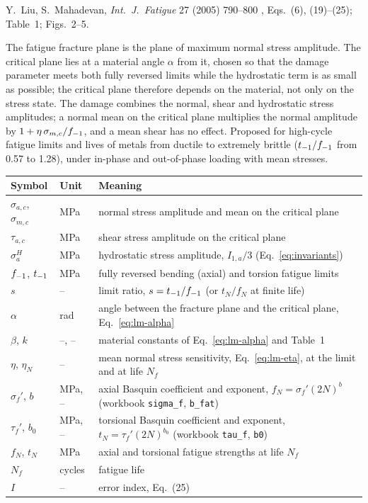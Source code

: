 \label{sheet:LIUMAHADEVAN}

 Y.~Liu, S.~Mahadevan, \emph{Int.\ J.\ Fatigue} 27 (2005) 790--800 \cite{liu2005},
Eqs.~(6), (19)--(25); Table~1; Figs.~2--5.

 The fatigue fracture plane is the plane of maximum normal stress amplitude. The
critical plane lies at a material angle $\alpha$ from it, chosen so that the damage parameter meets
both fully reversed limits while the hydrostatic term is as small as possible; the critical plane
therefore depends on the material, not only on the stress state. The damage combines the normal,
shear and hydrostatic stress amplitudes; a normal mean on the critical plane multiplies the normal
amplitude by $1+\eta\,\sigma_{m,c}/f_{-1}$, and a mean shear has no effect. Proposed for high-cycle
fatigue limits and lives of metals from ductile to extremely brittle ($t_{-1}/f_{-1}$ from 0.57 to 1.28),
under in-phase and out-of-phase loading with mean stresses.

\begin{center}\small
\begin{tabular}{@{}llp{100mm}@{}}
\toprule
Symbol & Unit & Meaning\\\midrule
$\sigma_{a,c}$, $\sigma_{m,c}$ & MPa & normal stress amplitude and mean on the critical plane\\
$\tau_{a,c}$ & MPa & shear stress amplitude on the critical plane\\
$\sigma^H_a$ & MPa & hydrostatic stress amplitude, $I_{1,a}/3$ (Eq.~\eqref{eq:invariants})\\
$f_{-1}$, $t_{-1}$ & MPa & fully reversed bending (axial) and torsion fatigue limits\\
$s$ & -- & limit ratio, $s=t_{-1}/f_{-1}$ (or $t_N/f_N$ at finite life)\\
$\alpha$ & rad & angle between the fracture plane and the critical plane, Eq.~\eqref{eq:lm-alpha}\\
$\beta$, $k$ & --, -- & material constants of Eq.~\eqref{eq:lm-alpha} and Table~1\\
$\eta$, $\eta_N$ & -- & mean normal stress sensitivity, Eq.~\eqref{eq:lm-eta}, at the limit and at life $N_f$\\
$\sigma_f'$, $b$ & MPa, -- & axial Basquin coefficient and exponent, $f_N=\sigma_f'(2N)^b$ (workbook \texttt{sigma\_f}, \texttt{b\_fat})\\
$\tau_f'$, $b_0$ & MPa, -- & torsional Basquin coefficient and exponent, $t_N=\tau_f'(2N)^{b_0}$ (workbook \texttt{tau\_f}, \texttt{b0})\\
$f_N$, $t_N$ & MPa & axial and torsional fatigue strengths at life $N_f$\\
$N_f$ & cycles & fatigue life\\
$I$ & -- & error index, Eq.~(25)\\
\bottomrule
\end{tabular}
\end{center}

